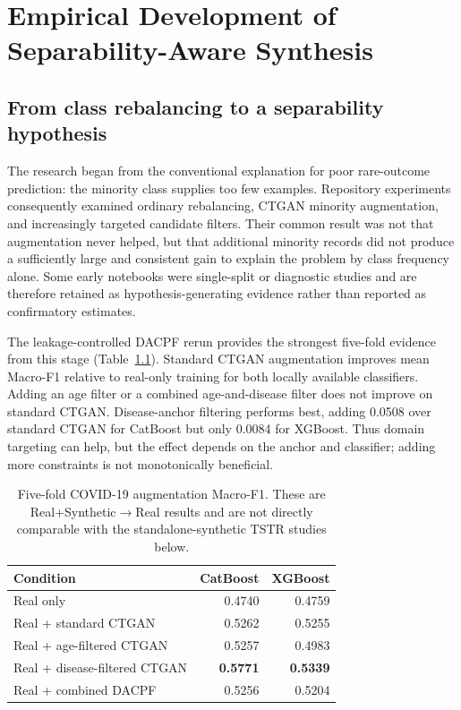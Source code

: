 \chapter{Empirical Development of Separability-Aware Synthesis}
\label{chap:completed}

\section{From class rebalancing to a separability hypothesis}

The research began from the conventional explanation for poor rare-outcome prediction: the minority class supplies too few examples. Repository experiments consequently examined ordinary rebalancing, CTGAN minority augmentation, and increasingly targeted candidate filters. Their common result was not that augmentation never helped, but that additional minority records did not produce a sufficiently large and consistent gain to explain the problem by class frequency alone. Some early notebooks were single-split or diagnostic studies and are therefore retained as hypothesis-generating evidence rather than reported as confirmatory estimates.

The leakage-controlled DACPF rerun provides the strongest five-fold evidence from this stage (Table~\ref{tab:dacpf}). Standard CTGAN augmentation improves mean Macro-F1 relative to real-only training for both locally available classifiers. Adding an age filter or a combined age-and-disease filter does not improve on standard CTGAN. Disease-anchor filtering performs best, adding 0.0508 over standard CTGAN for CatBoost but only 0.0084 for XGBoost. Thus domain targeting can help, but the effect depends on the anchor and classifier; adding more constraints is not monotonically beneficial.

\begin{table}[htbp]
\centering
\caption{Five-fold COVID-19 augmentation Macro-F1. These are Real+Synthetic$\rightarrow$Real results and are not directly comparable with the standalone-synthetic TSTR studies below.}
\label{tab:dacpf}
\begin{tabular}{lrr}
\toprule
Condition & CatBoost & XGBoost\\
\midrule
Real only & 0.4740 & 0.4759\\
Real + standard CTGAN & 0.5262 & 0.5255\\
Real + age-filtered CTGAN & 0.5257 & 0.4983\\
Real + disease-filtered CTGAN & \textbf{0.5771} & \textbf{0.5339}\\
Real + combined DACPF & 0.5256 & 0.5204\\
\bottomrule
\end{tabular}
\end{table}

